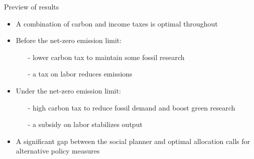 \documentclass[11pt,aspectratio=169]{beamer}
\newcommand{\tr}[1]{\textcolor{blue}{#1}}
\begin{document}
\begin{frame}{Preview of results}
	\vspace{-3mm}
	\pause
	\begin{itemize}[<+-| alert@+>]
		\item A combination of carbon and income taxes is optimal throughout
		\vspace{2mm}
	\item Before the net-zero emission limit: 
	\begin{itemize}
		\item[-] lower carbon tax to maintain some fossil research
		\item[-] a tax on labor reduces emissions
	\end{itemize}
	\vspace{3mm}
	\item Under the net-zero emission limit: 
	\begin{itemize}
		\item[-]  high carbon tax to reduce fossil demand and boost green research
		\item[-]  a subsidy on labor stabilizes output
	\end{itemize}
	\item A significant gap between the social planner and optimal allocation calls for alternative policy measures
\end{itemize}
\end{frame}
\end{document}
